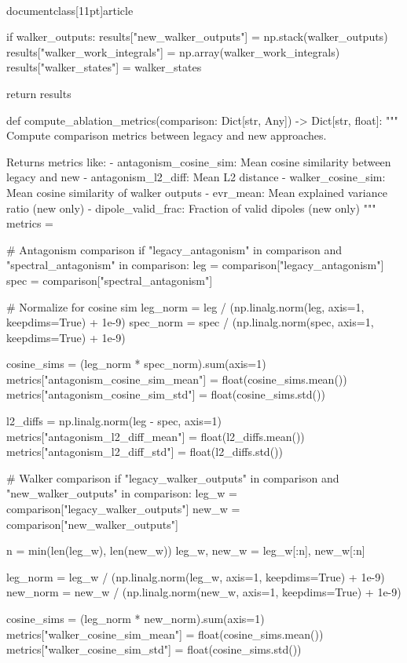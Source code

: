 \\documentclass[11pt]{article}
\begin{document}
\begin{CodeBlock}
    if walker_outputs:
        results["new_walker_outputs"] = np.stack(walker_outputs)
        results["walker_work_integrals"] = np.array(walker_work_integrals)
        results["walker_states"] = walker_states

    return results


def compute_ablation_metrics(comparison: Dict[str, Any]) -> Dict[str, float]:
    """
    Compute comparison metrics between legacy and new approaches.

    Returns metrics like:
        - antagonism_cosine_sim: Mean cosine similarity between legacy and new
        - antagonism_l2_diff: Mean L2 distance
        - walker_cosine_sim: Mean cosine similarity of walker outputs
        - evr_mean: Mean explained variance ratio (new only)
        - dipole_valid_frac: Fraction of valid dipoles (new only)
    """
    metrics = {}

    # Antagonism comparison
    if "legacy_antagonism" in comparison and "spectral_antagonism" in comparison:
        leg = comparison["legacy_antagonism"]
        spec = comparison["spectral_antagonism"]

        # Normalize for cosine sim
        leg_norm = leg / (np.linalg.norm(leg, axis=1, keepdims=True) + 1e-9)
        spec_norm = spec / (np.linalg.norm(spec, axis=1, keepdims=True) + 1e-9)

        cosine_sims = (leg_norm * spec_norm).sum(axis=1)
        metrics["antagonism_cosine_sim_mean"] = float(cosine_sims.mean())
        metrics["antagonism_cosine_sim_std"] = float(cosine_sims.std())

        l2_diffs = np.linalg.norm(leg - spec, axis=1)
        metrics["antagonism_l2_diff_mean"] = float(l2_diffs.mean())
        metrics["antagonism_l2_diff_std"] = float(l2_diffs.std())

    # Walker comparison
    if "legacy_walker_outputs" in comparison and "new_walker_outputs" in comparison:
        leg_w = comparison["legacy_walker_outputs"]
        new_w = comparison["new_walker_outputs"]

        n = min(len(leg_w), len(new_w))
        leg_w, new_w = leg_w[:n], new_w[:n]

        leg_norm = leg_w / (np.linalg.norm(leg_w, axis=1, keepdims=True) + 1e-9)
        new_norm = new_w / (np.linalg.norm(new_w, axis=1, keepdims=True) + 1e-9)

        cosine_sims = (leg_norm * new_norm).sum(axis=1)
        metrics["walker_cosine_sim_mean"] = float(cosine_sims.mean())
        metrics["walker_cosine_sim_std"] = float(cosine_sims.std())


\end{CodeBlock}
\end{document}

